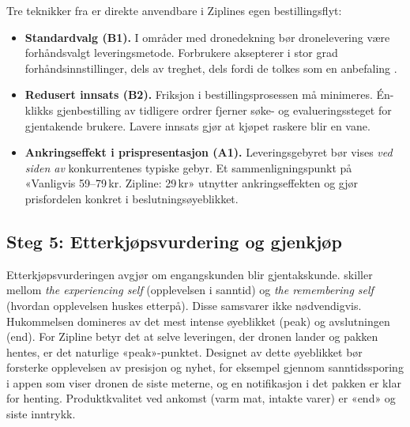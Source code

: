 \documentclass[12pt, a4paper]{article}
\begin{document}
Tre teknikker fra \textcite{muenscher2016} er direkte anvendbare i
Ziplines egen bestillingsflyt:

\begin{itemize}[leftmargin=2em]
  \item \textbf{Standardvalg (B1).}
    I områder med dronedekning bør dronelevering være forhåndsvalgt
    leveringsmetode. Forbrukere aksepterer i stor grad
    forhåndsinnstillinger, dels av treghet, dels fordi de tolkes som en
    anbefaling \parencite[jf.][]{muenscher2016, thalersunstein2008}.

  \item \textbf{Redusert innsats (B2).}
    Friksjon i bestillingsprosessen må minimeres. Én-klikks gjenbestilling
    av tidligere ordrer fjerner søke- og evalueringssteget for gjentakende
    brukere. Lavere innsats gjør at kjøpet raskere blir en vane.

  \item \textbf{Ankringseffekt i prispresentasjon (A1).}
    Leveringsgebyret bør vises \textit{ved siden av} konkurrentenes typiske
    gebyr. Et sammenligningspunkt på «Vanligvis 59--79\,kr. Zipline:
    29\,kr» utnytter ankringseffekten \parencite[jf.][]{thalersunstein2008}
    og gjør prisfordelen konkret i beslutningsøyeblikket.
\end{itemize}

\subsection{Steg 5: Etterkjøpsvurdering og gjenkjøp}

Etterkjøpsvurderingen avgjør om engangskunden blir gjentakskunde.
\textcite{kahnemanriis2005} skiller mellom \textit{the experiencing self}
(opplevelsen i sanntid) og \textit{the remembering self} (hvordan
opplevelsen huskes etterpå). Disse samsvarer ikke nødvendigvis. Hukommelsen
domineres av det mest intense øyeblikket (peak) og avslutningen (end). For
Zipline betyr det at selve leveringen, der dronen lander og pakken hentes,
er det naturlige «peak»-punktet. Designet av dette øyeblikket bør
forsterke opplevelsen av presisjon og nyhet, for eksempel gjennom
sanntidssporing i appen som viser dronen de siste meterne, og en
notifikasjon i det pakken er klar for henting. Produktkvalitet ved ankomst
(varm mat, intakte varer) er «end» og siste inntrykk.
\end{document}
